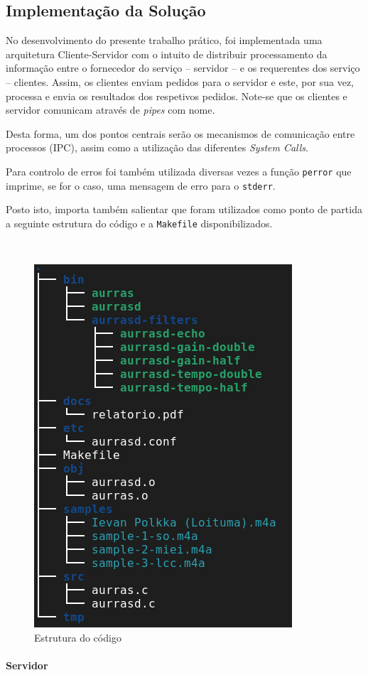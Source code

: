 \documentclass[a4paper, 11pt]{article}
\begin{document}
\subsection{Implementação da Solução}

No desenvolvimento do presente trabalho prático, foi implementada uma arquitetura Cliente-Servidor 
com o intuito de distribuir processamento da informação entre o fornecedor do serviço -- 
servidor -- e os requerentes dos serviço -- clientes. Assim, os clientes enviam pedidos para o 
servidor e este, por sua vez, processa e envia os resultados dos respetivos pedidos. Note-se que os 
clientes e servidor comunicam através de \textit{pipes} com nome. 

Desta forma, um dos pontos centrais serão os mecanismos de comunicação entre processos (IPC), 
assim como a utilização das diferentes \textit{System Calls}.

Para controlo de erros foi também utilizada diversas vezes a função \texttt{perror} que imprime, 
se for o caso, uma mensagem de erro para o \texttt{stderr}.

Posto isto, importa também salientar que foram utilizados como ponto de partida a seguinte 
estrutura do código e a \texttt{Makefile} disponibilizados.

\

\begin{figure}[H]
    \centering
    \includegraphics[width=.4\textwidth]{img/estrutura.png}
    \caption{Estrutura do código}
\end{figure}


\paragraph{Servidor\\}
\end{document}
